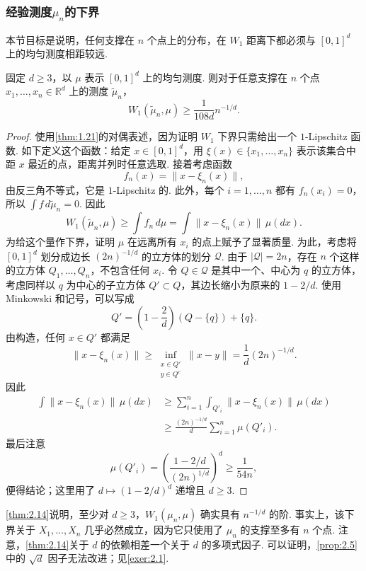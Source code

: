 \subsubsection{经验测度\texorpdfstring{$\mu_n$}{mu-n}的下界}\label{sec:2.6.1}
本节目标是说明，任何支撑在 $n$ 个点上的分布，在 $W_1$ 距离下都必须与 $[0,1]^d$ 上的均匀测度相距较远.
\begin{theorem}\label{thm:2.14}
固定 $d\ge3$，以 $\mu$ 表示 $[0,1]^d$ 上的均匀测度. 则对于任意支撑在 $n$ 个点 $x_1,\ldots,x_n\in\mathbb R^d$ 上的测度 $\tilde\mu_n$，
$$W_1(\tilde\mu_n,\mu)\ge\frac1{108d}n^{-1/d}.$$
\end{theorem}
\begin{proof}
使用\autoref{thm:1.21}的对偶表述，因为证明 $W_1$ 下界只需给出一个 $1$-Lipschitz 函数. 如下定义这个函数：给定 $x\in[0,1]^d$，用 $\xi(x)\in\{x_1,\ldots,x_n\}$ 表示该集合中距 $x$ 最近的点，距离并列时任意选取. 接着考虑函数
$$f_n(x)=\lVert x-\xi_n(x)\rVert,$$
由反三角不等式，它是 $1$-Lipschitz 的. 此外，每个 $i=1,\ldots,n$ 都有 $f_n(x_i)=0$，所以 $\int f\,d\tilde\mu_n=0$. 因此
$$W_1(\tilde\mu_n,\mu)\ge\int f_n\,d\mu=\int\lVert x-\xi_n(x)\rVert\,\mu(dx).$$
为给这个量作下界，证明 $\mu$ 在远离所有 $x_i$ 的点上赋予了显著质量. 为此，考虑将 $[0,1]^d$ 划分成边长 $(2n)^{-1/d}$ 的立方体的划分 $\mathcal Q$. 由于 $|\mathcal Q|=2n$，存在 $n$ 个这样的立方体 $Q_1,\ldots,Q_n$，不包含任何 $x_i$. 令 $Q\in\mathcal Q$ 是其中一个、中心为 $q$ 的立方体，考虑同样以 $q$ 为中心的子立方体 $Q'\subset Q$，其边长缩小为原来的 $1-2/d$. 使用 Minkowski 和记号，可以写成
$$Q'=\left(1-\frac2d\right)(Q-\{q\})+\{q\}.$$
由构造，任何 $x\in Q'$ 都满足
$$\lVert x-\xi_n(x)\rVert\ge\inf_{\substack{x\in Q'\\y\in Q^c}}\lVert x-y\rVert=\frac1d(2n)^{-1/d}.$$
因此
$$\begin{aligned}
\int\lVert x-\xi_n(x)\rVert\,\mu(dx)
&\ge\sum_{i=1}^n\int_{Q'_i}\lVert x-\xi_n(x)\rVert\,\mu(dx)\\
&\ge\frac{(2n)^{-1/d}}d\sum_{i=1}^n\mu(Q'_i).
\end{aligned}$$
最后注意
$$\mu(Q'_i)=\left(\frac{1-2/d}{(2n)^{1/d}}\right)^d\ge\frac1{54n},$$
便得结论；这里用了 $d\mapsto(1-2/d)^d$ 递增且 $d\ge3$.
\end{proof}
\autoref{thm:2.14}说明，至少对 $d\ge3$，$W_1(\mu_n,\mu)$ 确实具有 $n^{-1/d}$ 的阶. 事实上，该下界关于 $X_1,\ldots,X_n$ 几乎必然成立，因为它只使用了 $\mu_n$ 的支撑至多有 $n$ 个点. 注意，\autoref{thm:2.14}关于 $d$ 的依赖相差一个关于 $d$ 的多项式因子. 可以证明，\autoref{prop:2.5}中的 $\sqrt d$ 因子无法改进；见\autoref{exer:2.1}.

